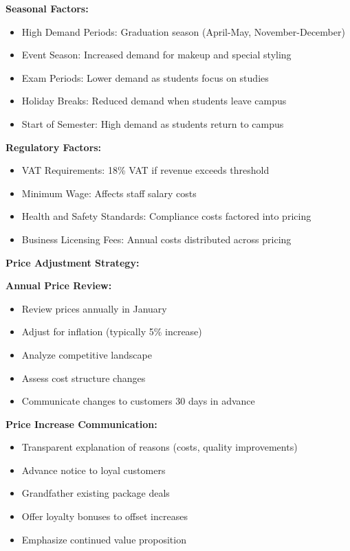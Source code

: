\documentclass[a4paper,12pt]{article}
\begin{document}
\textbf{Seasonal Factors:}
\begin{itemize}[leftmargin=2em]
    \item High Demand Periods: Graduation season (April-May, November-December)
    \item Event Season: Increased demand for makeup and special styling
    \item Exam Periods: Lower demand as students focus on studies
    \item Holiday Breaks: Reduced demand when students leave campus
    \item Start of Semester: High demand as students return to campus
\end{itemize}

\textbf{Regulatory Factors:}
\begin{itemize}[leftmargin=2em]
    \item VAT Requirements: 18\% VAT if revenue exceeds threshold
    \item Minimum Wage: Affects staff salary costs
    \item Health and Safety Standards: Compliance costs factored into pricing
    \item Business Licensing Fees: Annual costs distributed across pricing
\end{itemize}

\vspace{1em}

\textbf{Price Adjustment Strategy:}

\textbf{Annual Price Review:}
\begin{itemize}[leftmargin=2em]
    \item Review prices annually in January
    \item Adjust for inflation (typically 5\% increase)
    \item Analyze competitive landscape
    \item Assess cost structure changes
    \item Communicate changes to customers 30 days in advance
\end{itemize}

\textbf{Price Increase Communication:}
\begin{itemize}[leftmargin=2em]
    \item Transparent explanation of reasons (costs, quality improvements)
    \item Advance notice to loyal customers
    \item Grandfather existing package deals
    \item Offer loyalty bonuses to offset increases
    \item Emphasize continued value proposition
\end{itemize}
\end{document}
